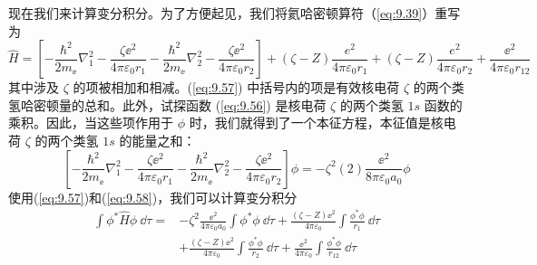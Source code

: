     现在我们来计算变分积分。为了方便起见，我们将氦哈密顿算符（\ref{eq:9.39}）重写为
    \begin{equation}
        \hat{H} = \left[-\frac{\hbar^2}{2m_{\ee }}\nabla_1^2 - \frac{\zeta\ee ^2}{4\pi\varepsilon_0r_1} - \frac{\hbar^2}{2m_{\ee }}\nabla_2^2 - \frac{\zeta\ee ^2}{4\pi\varepsilon_0r_2} \right] + \left(\zeta - Z\right)\frac{e^2}{4\pi\varepsilon_0r_{1}} + \left(\zeta - Z\right)\frac{e^2}{4\pi\varepsilon_0r_{2}} + \frac{\ee ^2}{4\pi\varepsilon_0r_{12}}
        \label{eq:9.57}
    \end{equation}
    其中涉及 $\zeta$ 的项被相加和相减。(\ref{eq:9.57}) 中括号内的项是有效核电荷 $\zeta$ 的两个类氢哈密顿量的总和。此外，试探函数 (\ref{eq:9.56}) 是核电荷 $\zeta$ 的两个类氢 $1s$ 函数的乘积。因此，当这些项作用于 $\phi$ 时，我们就得到了一个本征方程，本征值是核电荷 $\zeta$ 的两个类氢 $1s$ 的能量之和：
    \begin{equation}
        \left[-\frac{\hbar^2}{2m_{\ee }}\nabla_1^2 - \frac{\zeta\ee ^2}{4\pi\varepsilon_0r_1} - \frac{\hbar^2}{2m_{\ee }}\nabla_2^2 - \frac{\zeta\ee ^2}{4\pi\varepsilon_0r_2} \right] \phi = -\zeta^2\left(2\right)\frac{\ee ^2}{8\pi\varepsilon_0a_0}\phi
        \label{eq:9.58}
    \end{equation}
    使用(\ref{eq:9.57})和(\ref{eq:9.58})，我们可以计算变分积分
    \begin{equation}
        \begin{aligned}
            \int \phi^* \hat{H} \phi \:\dd \tau = &-\zeta^2\frac{\ee ^2}{4\pi\varepsilon_0a_0} \int \phi^* \phi \:\dd \tau + \frac{\left(\zeta - Z\right)\ee ^2}{4\pi\varepsilon_0} \int \frac{\phi^*\phi}{r_1} \:\dd \tau \\
            &+ \frac{\left(\zeta - Z\right)\ee ^2}{4\pi\varepsilon_0} \int \frac{\phi^*\phi}{r_2} \:\dd \tau + \frac{\ee ^2}{4\pi\varepsilon_0}\int \frac{\phi^*\phi}{r_{12}} \:\dd \tau
        \end{aligned}
        \label{eq:9.59}
    \end{equation}

